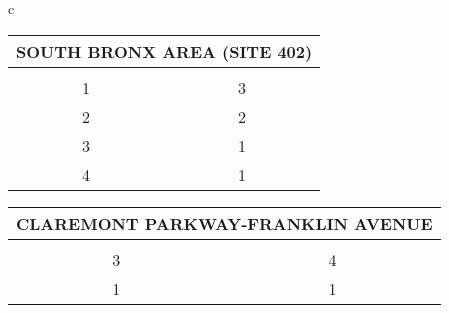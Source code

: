 \begin{table}[H]
\begin{tabular}{c}
                        \begin{tabular}{cc}
                        \multicolumn{2}{l}{SOUTH BRONX AREA (SITE 402)}                                                                                                                                   \\ \hline
                        \rowcolor{\ccorange} 
                        \multicolumn{1}{|c|}{\cellcolor{\ccorange}{\color[HTML]{FFFFFF} Building}} & \multicolumn{1}{c|}{\cellcolor{\ccorange}{\color[HTML]{FFFFFF} Total Repairs}} \\ \hline
                        \multicolumn{1}{|c|}{1}                                                        & \multicolumn{1}{c|}{3}                                                             \\ \hline
\multicolumn{1}{|c|}{2}                                                        & \multicolumn{1}{c|}{2}                                                             \\ \hline
\multicolumn{1}{|c|}{3}                                                        & \multicolumn{1}{c|}{1}                                                             \\ \hline
\multicolumn{1}{|c|}{4}                                                        & \multicolumn{1}{c|}{1}                                                             \\ \hline
\end{tabular}
                        \begin{tabular}{cc}
                        \multicolumn{2}{l}{CLAREMONT PARKWAY-FRANKLIN AVENUE}                                                                                                                                   \\ \hline
                        \rowcolor{\ccorange} 
                        \multicolumn{1}{|c|}{\cellcolor{\ccorange}{\color[HTML]{FFFFFF} Building}} & \multicolumn{1}{c|}{\cellcolor{\ccorange}{\color[HTML]{FFFFFF} Total Repairs}} \\ \hline
                        \multicolumn{1}{|c|}{3}                                                        & \multicolumn{1}{c|}{4}                                                             \\ \hline
\multicolumn{1}{|c|}{1}                                                        & \multicolumn{1}{c|}{1}                                                             \\ \hline
\end{tabular} \\
                            \end{tabular}
                            \end{table}